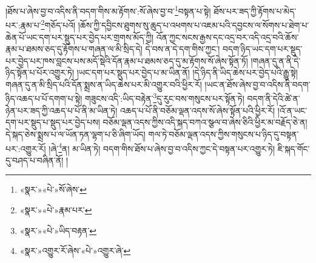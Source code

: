 །ཐོས་པ་ཞེས་བྱ་བ་འདིས་ནི་བདག་གིས་མ་རྟོགས་:སོ་ཞེས་བྱ་བ་\footnote{«སྣར་»«པེ་»སོ་ཞེས་}བསྟན་པ་སྟེ། ཐོས་པར་ཟད་ཀྱི་རྟོགས་པ་མེད་པར་:རྣམ་པ་\footnote{«སྣར་»«པེ་»རྣམ་པར་}གཅོད་པའོ། །ཆོས་ཀྱི་དབྱིངས་ཐུགས་སུ་ཆུད་པ་འཕགས་པ་འཇམ་པའི་དབྱངས་ལ་སོགས་པ་ཐེག་པ་ཆེན་པོ་ཡང་དག་པར་སྡུད་པར་བྱེད་པར་གྲགས་མོད་ཀྱི། འོན་ཀྱང་སངས་རྒྱས་དང་འདྲ་བར་འདི་འདྲ་བའི་ཆོས་རྣམ་པ་ཐམས་ཅད་དུ་རྟོགས་པ་གཞན་ལ་མི་སྲིད་དེ། དེ་བས་ན་དེ་དག་གིས་ཀྱང་། བདག་ཉིད་ཡང་དག་པར་སྡུད་པར་བྱེད་པར་ཁས་བླངས་པས་མདོ་སྡེའི་དོན་རྣམ་པ་ཐམས་ཅད་དུ་མ་རྟོགས་སོ་ཞེས་སྟོན་ཏོ། །གཞན་དུ་ན་ནི་དེ་ཉིད་སྟོན་པ་པོར་འགྱུར་ཏེ། །ཡང་དག་པར་སྡུད་པར་བྱེད་པ་མ་ཡིན་ནོ། །དེ་ཉིད་ནི་ཡིད་ཆེས་པར་བྱེད་པའི་རྒྱུ་སྟེ། གཞན་དུ་ན་མི་སྲིད་པའི་དོན་སྨྲས་ན་ཡིད་ཆེས་པར་མི་འགྱུར་བའི་ཕྱིར་རོ། །ཡང་ན་ཐོས་ཞེས་བྱ་བ་འདིས་ནི་བདག་ཉིད་འཆད་པ་པོ་དགག་པ་སྟེ། གཟུངས་འདི་:ཡིད་བརྟེན་\footnote{«སྣར་»«པེ་»ཡིད་བརྟན་}དུ་རུང་བས་གསུངས་པར་སྟོན་ཏེ། བདག་ནི་དེའི་ཚེ་ན་ཉེན་པར་ཟད་ཀྱི་འཆད་པ་པོ་ནི་མ་ཡིན་ཏེ། འཆད་པ་པོ་ནི་བཅོམ་ལྡན་འདས་སོ་ཞེས་སྟོན་པའི་ཕྱིར་རོ། །འོ་ན་ཡང་དག་པར་སྡུད་པ་སྡུད་པར་བྱེད་པས། བཅོམ་ལྡན་འདས་ཀྱིས་འདི་སྐད་བཀའ་སྩལ་བ་ཞེས་ཅིའི་ཕྱིར་མ་བརྗོད་ཅེ་ན། དེ་སྐད་ཅེས་སྨྲས་པ་ལ་ཡོན་ཏན་ལྷག་པ་ཅི་ཞིག་ཡོད། གལ་ཏེ་བཅོམ་ལྡན་འདས་ཀྱིས་གསུངས་པ་ཉིད་དུ་བསྟན་པར་:འགྱུར་རོ། །ཞེ་\footnote{«སྣར་»འགྱུར་རོ་ཞེས་«པེ་»འགྱུར་ཞེ་}ན། མ་ཡིན་ཏེ། བདག་གིས་ཐོས་པ་ཞེས་བྱ་བ་འདིས་ཀྱང་དེ་བསྟན་པར་འགྱུར་ཏེ། ཇི་སྐད་གོང་དུ་བཤད་པ་བཞིན་ནོ། །
